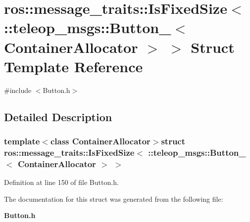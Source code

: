 \section{ros::message\_\-traits::IsFixedSize$<$ ::teleop\_\-msgs::Button\_\-$<$ ContainerAllocator $>$ $>$ Struct Template Reference}
\label{structros_1_1message__traits_1_1IsFixedSize_3_01_1_1teleop__msgs_1_1Button___3_01ContainerAllocator_01_4_01_4}


{\ttfamily \#include $<$Button.h$>$}



\subsection{Detailed Description}
\subsubsection*{template$<$class ContainerAllocator$>$struct ros::message\_\-traits::IsFixedSize$<$ ::teleop\_\-msgs::Button\_\-$<$ ContainerAllocator $>$ $>$}



Definition at line 150 of file Button.h.



The documentation for this struct was generated from the following file:\begin{DoxyCompactItemize}
\item 
{\bf Button.h}\end{DoxyCompactItemize}
